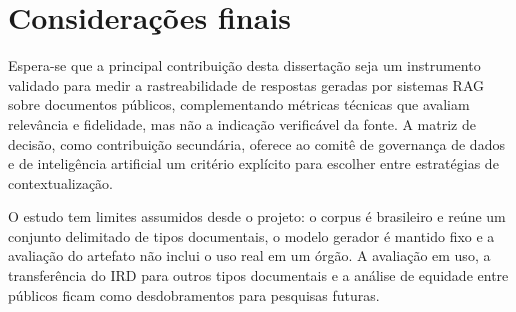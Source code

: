 
\section{Considerações finais}

Espera-se que a principal contribuição desta dissertação seja um instrumento
validado para medir a rastreabilidade de respostas geradas por sistemas RAG
sobre documentos públicos, complementando métricas técnicas que avaliam
relevância e fidelidade, mas não a indicação verificável da fonte. A matriz de
decisão, como contribuição secundária, oferece ao comitê de governança de dados
e de inteligência artificial um critério explícito para escolher entre
estratégias de contextualização.

O estudo tem limites assumidos desde o projeto: o corpus é brasileiro e reúne um
conjunto delimitado de tipos documentais, o modelo gerador é mantido fixo e a
avaliação do artefato não inclui o uso real em um órgão. A avaliação em uso, a
transferência do IRD para outros tipos documentais e a análise de equidade entre
públicos ficam como desdobramentos para pesquisas futuras.

